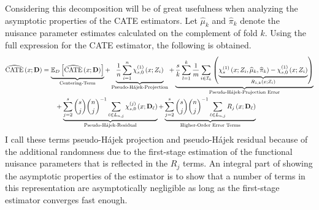 Considering this decomposition will be of great usefulness when analyzing the asymptotic properties of the CATE estimators.
Let $\hat{\mu}_{k}$ and $\hat{\pi}_{k}$ denote the nuisance parameter estimates calculated on the complement of fold $k$.
Using the full expression for the CATE estimator, the following is obtained.
\begin{equation}\label{eq:DNNDML2_Decomp}
    \begin{aligned}
        \widehat{\operatorname{CATE}}\left(x; \mathbf{D}\right)
        & = \underbrace{\mathbb{E}_{D}\left[\widehat{\operatorname{CATE}}\left(x; \mathbf{D}\right)\right]}_{\text{Centering-Term}}
        + \underbrace{\frac{1}{n}\sum_{i = 1}^{n} \chi_{s,0}^{(1)}\left(x; Z_{i}\right)}_{\text{Pseudo-H\'ajek-Projection}}
        + \underbrace{\frac{s}{k} \sum_{l = 1}^{k} \frac{1}{m} \sum_{i \in \mathcal{I}_{k}}\left(\underbrace{\chi_{s}^{(1)}\left(x; Z_{i}, \widehat{\mu}_k, \widehat{\pi}_k\right) - \chi_{s,0}^{(1)}\left(x; Z_{i}\right)}_{R_{1,k}\left(x; Z_{i}\right)}\right)}_{\text{Pseudo-H\'ajek-Projection Error}}\\
        & \quad \quad + \underbrace{\sum_{j = 2}^{s} \binom{s}{j} \binom{n}{j}^{-1}\sum_{\ell \in L_{n,j}} \chi_{s,0}^{(j)}\left(x; \mathbf{D}_{\ell}\right)}_{\text{Pseudo-H\'ajek-Residual}}
         + \underbrace{\sum_{j = 2}^{s} \binom{s}{j} \binom{n}{j}^{-1}\sum_{\ell \in L_{n,j}} R_{j}\left(x; \mathbf{D}_{\ell}\right)}_{\text{Higher-Order Error Terms}}
    \end{aligned}
\end{equation}
I call these terms pseudo-H\'ajek projection and pseudo-H\'ajek residual because of the additional randomness due to the first-stage estimation of the functional nuisance parameters that is reflected in the $R_j$ terms.
An integral part of showing the asymptotic properties of the estimator is to show that a number of terms in this representation are asymptotically negligible as long as the first-stage estimator converges fast enough.
